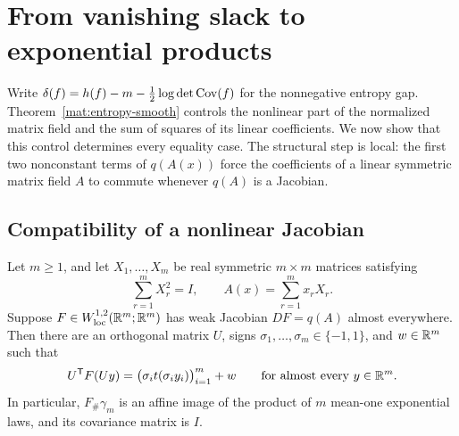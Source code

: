\section{From vanishing slack to exponential products}\label{sec:rigidity}

Write $\delta(f)=h(f)-m-\tfrac12\log\det\operatorname{Cov}(f)$ for the
nonnegative entropy gap.  Theorem~\ref{mat:entropy-smooth} controls the nonlinear part of the normalized
matrix field and the sum of squares of its linear coefficients.  We now
show that this control determines every equality case.  The structural
step is local: the first two nonconstant terms of $q(A(x))$ force the
coefficients of a linear symmetric matrix field $A$ to commute whenever
$q(A)$ is a Jacobian.

\subsection{Compatibility of a nonlinear Jacobian}

\begin{lemma}\label{lem:linear-jacobian}
Let $m\ge1$, and let $X_1,\ldots,X_m$ be real symmetric $m\times m$ matrices satisfying
\[
  \sum_{r=1}^m X_r^2=I,
  \qquad A(x)=\sum_{r=1}^m x_rX_r.
\]
Suppose $F\in W^{1,2}_{\mathrm{loc}}(\mathbb R^m;\mathbb R^m)$ has weak Jacobian
$DF=q(A)$ almost everywhere.  Then there are an orthogonal matrix $U$,
signs $\sigma_1,\ldots,\sigma_m\in\{-1,1\}$, and $w\in\mathbb R^m$ such that
\begin{equation}\label{eq:rigid-map}
  U^{\mathsf T}F(Uy)
  =\bigl(\sigma_i t(\sigma_i y_i)\bigr)_{i=1}^m+w
  \qquad\text{for almost every }y\in\mathbb R^m.
\end{equation}
In particular, $F_\#\gamma_m$ is an affine image of the product of $m$
mean-one exponential laws, and its covariance matrix is $I$.
\end{lemma}

